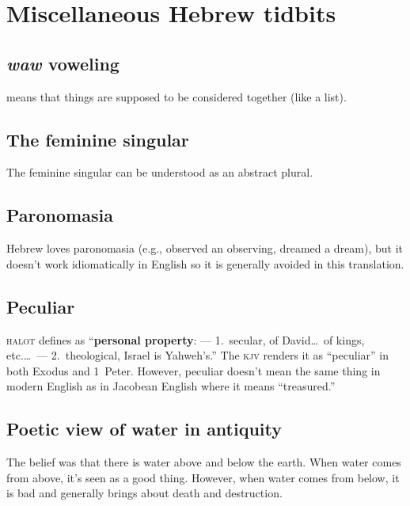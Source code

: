\section{Miscellaneous Hebrew tidbits}\label{app:misc-heb}
\subsection{\textit{waw} voweling}\label{app:waw-voweling}
 means that things are supposed to be considered together (like a list).

\subsection{The feminine singular}
The feminine singular can be understood as an abstract plural.

\subsection{Paronomasia}\label{app:paronomasia}
Hebrew loves paronomasia (e.g., observed an observing, dreamed a dream), but it doesn't work idiomatically in English so it is generally avoided in this translation.

\subsection{Peculiar}\label{app:peculiar}
\textsc{halot} defines  as ``\textbf{personal property}: --- 1.\ secular, of David\dots\ of kings, etc.\dots\ --- 2.\ theological, Israel is Yahweh's.'' The \textsc{kjv} renders it as ``peculiar'' in both Exodus and 1~Peter. However, peculiar doesn't mean the same thing in modern English as in Jacobean English where it means ``treasured.''

\subsection{Poetic view of water in antiquity}\label{app:water-in-antiquity}
The belief was that there is water above and below the earth. When water comes from above, it's seen as a good thing. However, when water comes from below, it is bad and generally brings about death and destruction.
